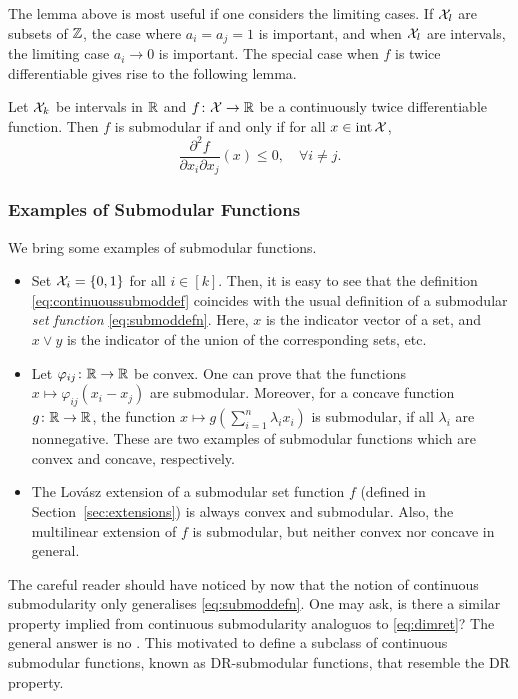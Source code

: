 The lemma above is most useful if one considers the limiting cases. If $\mathcal{X}_l$ are subsets of $\mathbb{Z}$, the case where $a_i = a_j = 1$ is important, and when $\mathcal{X}_l$ are intervals, the limiting case $a_i \to 0$ is important. The special case when $f$ is twice differentiable gives rise to the following lemma.

\begin{lemma}
    Let $\mathcal{X}_k$ be intervals in $\mathbb{R}$ and $f\colon \mathcal{X} \to \mathbb{R}$ be a continuously twice differentiable function. Then $f$ is submodular if and only if for all $x\in\mathop{\mathrm{int}}\mathcal{X}$,
    \[
        \frac{\partial^2 f}{\partial x_i \partial x_j} (x) \leq 0,\quad \forall i\neq j.
    \]
\end{lemma}

\subsubsection*{Examples of Submodular Functions}

We bring some examples of submodular functions.
\begin{itemize}
    \item Set $\mathcal{X}_i = \{0 ,1\}$ for all $i \in [k]$. Then, it is easy to see that the definition \eqref{eq:continuoussubmoddef} coincides with the usual definition of a submodular \emph{set function} \eqref{eq:submoddefn}. Here, $x$ is the indicator vector of a set, and $x\vee y$ is the indicator of the union of the corresponding sets, etc.

    \item Let $\varphi_{ij}\colon \mathbb{R}\to\mathbb{R}$ be convex. One can prove that the functions $x\mapsto \varphi_{ij}(x_i - x_j)$ are submodular. Moreover, for a concave function $g\colon\mathbb{R}\to\mathbb{R}$, the function $x\mapsto g(\sum_{i=1}^n \lambda_ix_i)$ is submodular, if all $\lambda_i$ are nonnegative. These are two examples of submodular functions which are convex and concave, respectively.

    \item The Lov\'asz extension of a submodular set function $f$ (defined in Section~\ref{sec:extensions}) is always convex and submodular. Also, the multilinear extension of $f$ is submodular, but neither convex nor concave in general.
\end{itemize}

The careful reader should have noticed by now that the notion of continuous submodularity only generalises \eqref{eq:submoddefn}. One may ask, is there a similar property implied from continuous submodularity analoguos to \eqref{eq:dimret}? The general answer is no \cite{soma2014optimal}. This motivated \citet{bian2016guaranteed} to define a subclass of continuous submodular functions, known as DR-submodular functions, that resemble the DR property. 

